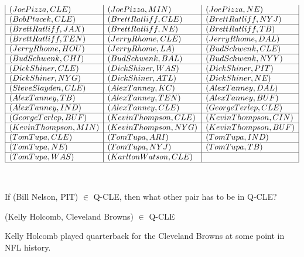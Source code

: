 \documentclass{ximera}
\begin{document}
\begin{center}
\[\begin{array}{|l|l|l|}
(Joe Pizza, CLE) & (Joe Pizza, MIN) & (Joe Pizza, NE) \\\hline 
(Bob Ptacek, CLE) & (Brett Ratliff, CLE) & (Brett Ratliff, NYJ) \\\hline 
(Brett Ratliff, JAX) & (Brett Ratliff, NE) & (Brett Ratliff, TB) \\\hline 
(Brett Ratliff, TEN) & (Jerry Rhome, CLE) & (Jerry Rhome, DAL) \\\hline 
(Jerry Rhome, HOU) & (Jerry Rhome, LA) & (Bud Schwenk, CLE) \\\hline 
(Bud Schwenk, CHI) & (Bud Schwenk, BAL) & (Bud Schwenk, NYY) \\\hline 
(Dick Shiner, CLE) & (Dick Shiner, WAS) & (Dick Shiner, PIT) \\\hline 
(Dick Shiner, NYG) & (Dick Shiner, ATL) & (Dick Shiner, NE) \\\hline 
(Steve Slayden, CLE) & (Alex Tanney, KC) & (Alex Tanney, DAL) \\\hline 
(Alex Tanney, TB) & (Alex Tanney, TEN) & (Alex Tanney, BUF) \\\hline 
(Alex Tanney, IND) & (Alex Tanney, CLE) & (George Terlep, CLE) \\\hline 
(George Terlep, BUF) & (Kevin Thompson, CLE) & (Kevin Thompson, CIN) \\\hline 
(Kevin Thompson, MIN) & (Kevin Thompson, NYG) & (Kevin Thompson, BUF) \\\hline 
(Tom Tupa, CLE) & (Tom Tupa, ARI) & (Tom Tupa, IND) \\\hline
(Tom Tupa, NE) & (Tom Tupa, NYJ) & (Tom Tupa, TB) \\\hline
(Tom Tupa, WAS) & (Karlton Watson, CLE) &    \\\hline
\end{array}
\]
\end{center}



\quad \\







\begin{fact}

If (Bill Nelson, PIT) $\in$ Q-CLE, then what other pair has to be in Q-CLE?



\begin{problem}  (Kelly Holcomb, Cleveland Browns) $\in$ Q-CLE
\begin{feedback}
Kelly Holcomb played quarterback for the Cleveland Browns at some point in NFL history.
\end{feedback}
\end{problem}


\end{fact}
\end{document}
